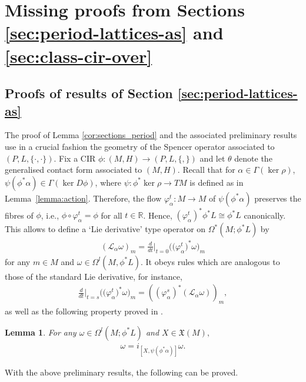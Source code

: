 \documentclass[pdftex]{sigma}
\numberwithin{equation}{section}
\newtheorem{Lemma}[Theorem]{Lemma}
\newcommand{\X}{\ensuremath{\mathfrak{X}}}
\newcommand{\JM}{(P,L,\{\cdot,\cdot\})} %
\newcommand{\CM}{(M,H)} %
\newcommand{\RR}{\mathbb{R}}
\begin{document}
\section{Missing proofs from Sections \ref{sec:period-lattices-as} and \ref{sec:class-cir-over}}\label{apendixC}

\subsection*{Proofs of results of Section \ref{sec:period-lattices-as}}
The proof of Lemma \ref{cor:sections_period} and the associated preliminary results use in a crucial fashion the geometry of the Spencer operator associated to $\JM$. Fix a CIR $\phi\colon \CM\to (P,L,\{,\})$ and let $\theta$ denote the generalised contact form associated to $\CM$. Recall that for $\alpha\in\Gamma(\ker\rho)$, $\psi( \phi^*\alpha) \in \Gamma(\ker D\phi)$, where $\psi \colon \phi^* \ker \rho \to TM$ is def\/ined as in Lemma~\ref{lemma:action}. Therefore, the f\/low $\varphi^t_{\alpha}\colon M\to M$ of $\psi(\phi^*\alpha)$ preserves the f\/ibres of $\phi$, i.e., $\phi\circ \varphi^t_{\alpha}=\phi$ for all $t \in \RR$. Hence, $(\varphi^t_{\alpha})^* \phi^* L \cong \phi^* L$ canonically. This allows to def\/ine a `Lie
derivative' type operator on $\Omega^*(M;\phi^*L)$ by
\begin{gather}\label{eq:lie_derivative}
(\mathcal{L}_{\alpha}\omega)_m=\frac{d}{dt}\Big\rvert_{t=0}\big(\big(\varphi^t_{\alpha}\big)^*\omega\big)_m\end{gather}
for any $m\in M$ and $\omega \in \Omega^l(M,\phi^*L)$. It obeys rules which are analogous to those of the standard Lie derivative, for instance,
\begin{gather} \label{eq:8}
 \frac{d}{dt}\Big\rvert_{t=s}\big(\big(\varphi^t_{\alpha}\big)^*\omega\big)_m = ((\varphi^s_{\alpha})^*(\mathcal{L}_{\alpha} \omega))_m,
\end{gather}
as well as the following property proved in \cite[Lemma 3.8]{Maria}.

\begin{Lemma}\label{lemma:imt}
 For any $\omega\in\Omega^l(M;\phi^*L)$ and $X\in\X(M),$
 \begin{gather*}
 [i_X,\mathcal{L}_{\alpha}]\omega= i_{[X,\psi(\phi^*\alpha)]}\omega.
 \end{gather*}
\end{Lemma}

With the above preliminary results, the following can be proved.
\end{document}
